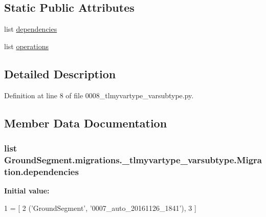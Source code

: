 \subsection*{Static Public Attributes}
\begin{DoxyCompactItemize}
\item 
list \hyperlink{class_ground_segment_1_1migrations_1_10008__tlmyvartype__varsubtype_1_1_migration_a884366b87634cacb98f26faad6f25289}{dependencies}
\item 
list \hyperlink{class_ground_segment_1_1migrations_1_10008__tlmyvartype__varsubtype_1_1_migration_a5f19c537bf10cef31d6fac0da2c2f4b5}{operations}
\end{DoxyCompactItemize}


\subsection{Detailed Description}


Definition at line 8 of file 0008\+\_\+tlmyvartype\+\_\+varsubtype.\+py.



\subsection{Member Data Documentation}
\hypertarget{class_ground_segment_1_1migrations_1_10008__tlmyvartype__varsubtype_1_1_migration_a884366b87634cacb98f26faad6f25289}{}
\subsubsection[{dependencies}]{\setlength{\rightskip}{0pt plus 5cm}list Ground\+Segment.\+migrations.\+\_\+tlmyvartype\+\_\+varsubtype.\+Migration.\+dependencies\hspace{0.3cm}{\ttfamily [static]}}\label{class_ground_segment_1_1migrations_1_10008__tlmyvartype__varsubtype_1_1_migration_a884366b87634cacb98f26faad6f25289}
{\bfseries Initial value\+:}
\begin{DoxyCode}
1 = [
2         (\textcolor{stringliteral}{'GroundSegment'}, \textcolor{stringliteral}{'0007\_auto\_20161126\_1841'}),
3     ]
\end{DoxyCode}


